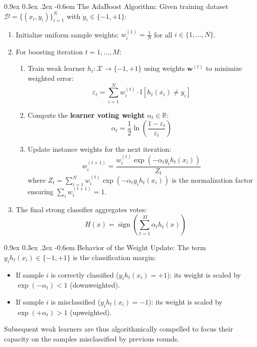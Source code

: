 \documentclass[11pt,a4paper]{article}
\makeatletter
\renewcommand\paragraph{\@startsection{paragraph}{4}{\z@}%
                                     {0.9ex \@plus0.3ex \@minus.2ex}%
                                     {-0.6em}%
                                     {\normalfont\normalsize\bfseries}}
\newcommand{\R}{\mathbb{R}}
\makeatother
\begin{document}
\paragraph{The AdaBoost Algorithm:}
Given training dataset $\mathcal{D} = \{(x_i, y_i)\}_{i=1}^N$ with $y_i \in \{-1, +1\}$:
\begin{enumerate}
    \item Initialize uniform sample weights: $w_i^{(1)} = \frac{1}{N}$ for all $i \in \{1, \dots, N\}$.
    \item For boosting iteration $t = 1, \dots, M$:
    \begin{enumerate}
        \item Train weak learner $h_t: \mathcal{X} \to \{-1, +1\}$ using weights $\mathbf{w}^{(t)}$ to minimize weighted error:
        \begin{equation}
            \varepsilon_t = \sum_{i=1}^N w_i^{(t)} \cdot \mathbb{I}[h_t(x_i) \ne y_i]
        \end{equation}
        \item Compute the \textbf{learner voting weight} $\alpha_t \in \R$:
        \begin{equation}
            \alpha_t = \frac{1}{2} \ln \left( \frac{1 - \varepsilon_t}{\varepsilon_t} \right)
        \end{equation}
        \item Update instance weights for the next iteration:
        \begin{equation}
            w_i^{(t+1)} = \frac{w_i^{(t)} \exp\left( -\alpha_t y_i h_t(x_i) \right)}{Z_t}
        \end{equation}
        where $Z_t = \sum_{i=1}^N w_i^{(t)} \exp(-\alpha_t y_i h_t(x_i))$ is the normalization factor ensuring $\sum_i w_i^{(t+1)} = 1$.
    \end{enumerate}
    \item The final strong classifier aggregates votes:
    \begin{equation}
        H(x) = \operatorname{sign}\left( \sum_{t=1}^M \alpha_t h_t(x) \right)
    \end{equation}
\end{enumerate}

\paragraph{Behavior of the Weight Update:}
The term $y_i h_t(x_i) \in \{-1, +1\}$ is the classification margin:
\begin{itemize}
    \item If sample $i$ is correctly classified ($y_i h_t(x_i) = +1$): its weight is scaled by $\exp(-\alpha_t) < 1$ (downweighted).
    \item If sample $i$ is misclassified ($y_i h_t(x_i) = -1$): its weight is scaled by $\exp(+\alpha_t) > 1$ (upweighted).
\end{itemize}
Subsequent weak learners are thus algorithmically compelled to focus their capacity on the samples misclassified by previous rounds.
\end{document}
